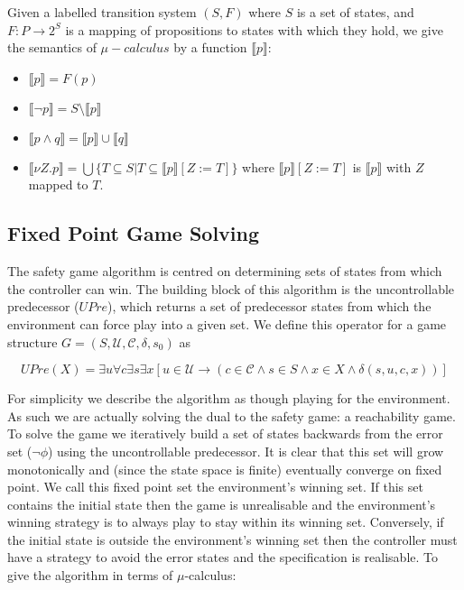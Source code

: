 Given a labelled transition system $(S, F)$ where $S$ is a set of states, and $F : P \to 2^S$ is a mapping of propositions to states with which they hold, we give the semantics of $\mu-calculus$ by a function $\llbracket p \rrbracket$:

\begin{itemize}
    \item $\llbracket p \rrbracket = F(p)$
    \item $\llbracket \lnot p \rrbracket = S \setminus \llbracket p \rrbracket$
    \item $\llbracket p \land q \rrbracket = \llbracket p \rrbracket \cup \llbracket q \rrbracket$
    \item $\llbracket \nu Z . p \rrbracket = \bigcup \{ T \subseteq S | T \subseteq \llbracket p \rrbracket [ Z := T ] \}$ where $\llbracket p \rrbracket [ Z := T ]$ is $\llbracket p \rrbracket$ with $Z$ mapped to $T$.
\end{itemize}

\subsection{Fixed Point Game Solving}

The safety game algorithm is centred on determining sets of states from which the controller can win. The building block of this algorithm is the uncontrollable predecessor ($UPre$), which returns a set of predecessor states from which the environment can force play into a given set. We define this operator for a game structure $G = (S, \mathcal{U}, \mathcal{C}, \delta, s_0)$ as 

$$UPre(X) = \exists u \forall c \exists s \exists x [u \in \mathcal{U} \to (c \in \mathcal{C} \land s \in S \land x \in X \land \delta(s, u, c, x))]$$

For simplicity we describe the algorithm as though playing for the environment. As such we are actually solving the dual to the safety game: a reachability game.  To solve the game we iteratively build a set of states backwards from the error set ($\lnot \phi$) using the uncontrollable predecessor. It is clear that this set will grow monotonically and (since the state space is finite) eventually converge on fixed point. We call this fixed point set the environment's winning set. If this set contains the initial state then the game is unrealisable and the environment's winning strategy is to always play to stay within its winning set. Conversely, if the initial state is outside the environment's winning set then the controller must have a strategy to avoid the error states and the specification is realisable. To give the algorithm in terms of $\mu$-calculus:

